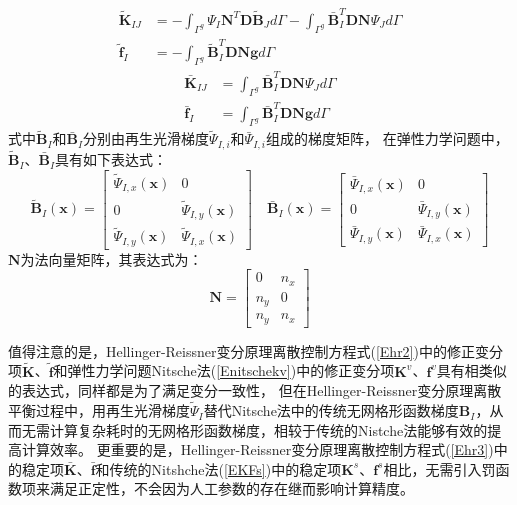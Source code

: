 \begin{subequations}\label{Ehr2}  
\begin{align}   
    \label{Ehr21}    \tilde{\pmb{K}}_{IJ}&=-\int_{\Gamma^g}\Psi_I\pmb{N}^T\pmb{D}\tilde{\pmb B}_Jd\Gamma-\int_{\Gamma^g}\bar{\pmb B}_I^T\pmb{D}\pmb{N}\Psi_Jd\Gamma\\
    \label{Ehr22}   \tilde{\pmb f}_I&=-\int_{\Gamma^g}\tilde{\pmb B}_I^T\pmb D\pmb N\pmb{g}d\Gamma
\end{align}
\end{subequations}
\begin{subequations}\label{Ehr3}
\begin{align} 
    \label{Ehr31}   \bar{\pmb K}_{IJ}&=\int_{\Gamma^g}\bar{\pmb B}_I^T\pmb D\pmb N\Psi_Jd\Gamma\\
    \label{Ehr32}  \bar{\pmb f}_I&=\int_{\Gamma^g}\bar{\pmb B}_I^T\pmb D\pmb N \pmb{g}d\Gamma
\end{align}
\end{subequations}
式中$\tilde{\pmb B}_I$和$\bar{\pmb B}_I$分别由再生光滑梯度$\tilde{\Psi}_{I,i}$和$\bar{\Psi}_{I,i}$组成的梯度矩阵，
在弹性力学问题中，$\tilde{\pmb B}_I$、$\bar{\pmb B}_I$具有如下表达式：
\begin{equation}
    \tilde{\pmb{B}}_I(\pmb{x})= \begin{bmatrix}\tilde{\Psi}_{I,x}(\pmb{x})&0\\0&\tilde{\Psi}_{I,y}(\pmb{x})\\\tilde{\Psi}_{I,y}(\pmb{x})&\tilde{\Psi}_{I,x}(\pmb{x}) \end{bmatrix} 
    \quad
    \bar{\pmb{B}}_I(\pmb{x})= \begin{bmatrix}\bar{\Psi}_{I,x}(\pmb{x})&0\\0&\bar{\Psi}_{I,y}(\pmb{x})\\\bar{\Psi}_{I,y}(\pmb{x})&\bar{\Psi}_{I,x}(\pmb{x}) \end{bmatrix}
\end{equation}
$\pmb N$为法向量矩阵，其表达式为：
\begin{equation}
    \pmb{N}=\begin{bmatrix} 0&n_x\\n_y&0\\n_y&n_x
    \end{bmatrix}
\end{equation}\par
值得注意的是，Hellinger-Reissner变分原理离散控制方程式(\ref{Ehr2})中的修正变分项$\tilde{\pmb K}$、$\tilde{\pmb f}$和弹性力学问题Nitsche法(\ref{Enitschekv})中的修正变分项$\pmb K^v$、$\pmb f^v$具有相类似的表达式，同样都是为了满足变分一致性，
但在Hellinger-Reissner变分原理离散平衡过程中，用再生光滑梯度$\tilde{\Psi}_I$替代Nitsche法中的传统无网格形函数梯度$\pmb{B}_I$，从而无需计算复杂耗时的无网格形函数梯度，相较于传统的Nistche法能够有效的提高计算效率。
更重要的是，Hellinger-Reissner变分原理离散控制方程式(\ref{Ehr3})中的稳定项$\bar{\pmb K}$、$\bar{\pmb f}$和传统的Nitshche法(\ref{EKFs})中的稳定项$\pmb{K}^s$、$\pmb f^s$相比，无需引入罚函数项来满足正定性，不会因为人工参数的存在继而影响计算精度。
